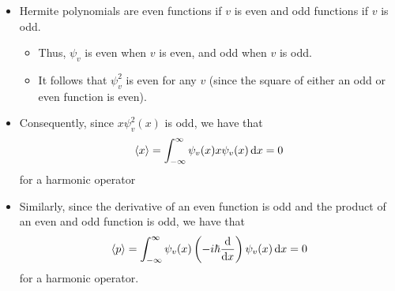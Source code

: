 \documentclass[../notes.tex]{subfiles}
\begin{document}
\begin{itemize}
    \item Hermite polynomials are even functions if $v$ is even and odd functions if $v$ is odd.
    \begin{itemize}
        \item Thus, $\psi_v$ is even when $v$ is even, and odd when $v$ is odd.
        \item It follows that $\psi_v^2$ is even for any $v$ (since the square of either an odd or even function is even).
    \end{itemize}
    \item Consequently, since $x\psi_v^2(x)$ is odd, we have that
    \begin{equation*}
        \langle{x}\rangle = \int_{-\infty}^\infty\psi_v(x)x\psi_v(x)\dd{x} = 0
    \end{equation*}
    for a harmonic operator
    \item Similarly, since the derivative of an even function is odd and the product of an even and odd function is odd, we have that
    \begin{equation*}
        \langle{p}\rangle = \int_{-\infty}^\infty\psi_v(x)\left( -i\hbar\dv{x} \right)\psi_v(x)\dd{x} = 0
    \end{equation*}
    for a harmonic operator.
\end{itemize}
\end{document}
